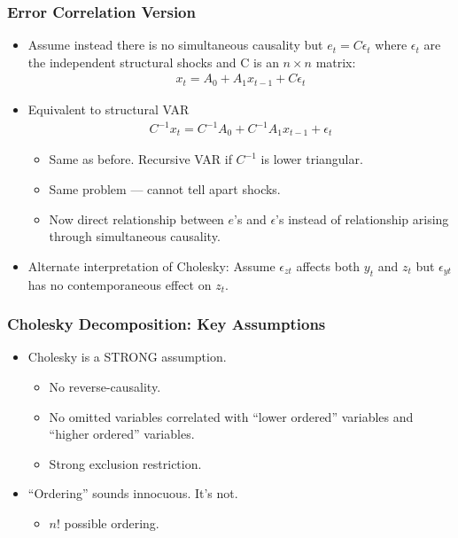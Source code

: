 \documentclass[english,xcolor=svgnames]{beamer}
\begin{document}
\begin{frame}
\frametitle{Error Correlation Version
}
\begin{itemize}
	\item Assume instead there is no simultaneous causality but
$e_t = C\epsilon_t$ where $\epsilon_t$ are the independent structural shocks and C is an $n\times n$ matrix:
	\begin{align*}
		x_t=A_0+A_1 x_{t-1}+C\epsilon_t
	\end{align*}
	\item Equivalent to structural VAR
	\begin{align*}
		C^{-1}x_t=C^{-1}A_0+C^{-1}A_1 x_{t-1}+\epsilon_t
	\end{align*}
	\begin{itemize}
		\item Same as before. Recursive VAR if $C^{-1}$ is lower triangular.
		\item Same problem --- cannot tell apart shocks.
		\item Now direct relationship between $e$'s and $\epsilon$'s instead of
relationship arising through simultaneous causality.
	\end{itemize}
	\item Alternate interpretation of Cholesky: Assume $\epsilon_{zt}$ affects both $y_t$ and $z_t$ but $\epsilon_{yt}$ has no contemporaneous effect on $z_t$.
\end{itemize}
\end{frame}


\begin{frame}
\frametitle{Cholesky Decomposition: Key Assumptions
}
\begin{itemize}
	\item Cholesky is a STRONG assumption.
	\begin{itemize}
		\item No reverse-causality.
		\item No omitted variables correlated with ``lower ordered'' variables
and ``higher ordered'' variables.
		\item Strong exclusion restriction.
	\end{itemize}
	\item ``Ordering'' sounds innocuous. It's not.
	\begin{itemize}
		\item $n!$ possible ordering.
	\end{itemize}
\end{itemize}
\end{frame}
\end{document}
